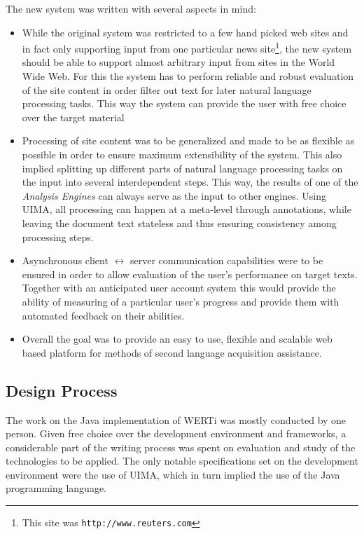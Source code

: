 \documentclass[12pt]{scrartcl}
\begin{document}
The new system was written with several aspects in mind:
\begin{itemize}
  \item While the original system was restricted to a few hand picked web sites
    and in fact only supporting input from one particular news
    site\footnote{This site was \texttt{http://www.reuters.com}}, the new system
    should be able to support almost arbitrary input from sites in the World
    Wide Web. For this the system has to perform reliable and robust evaluation
    of the site content in order filter out text for later natural language
    processing tasks. This way the system can provide the user with free choice over the
    target material %
  \item Processing of site content was to  be generalized and made to be as
    flexible as possible in order to ensure maximum extensibility of the
    system. This also implied splitting up different parts of natural
    language 
    processing tasks on the input into several interdependent steps. This way,
    the results of one of the \emph{Analysis Engines} can always serve as the
    input to other engines. Using UIMA, all processing can happen at a
    meta-level through annotations, while leaving the document text stateless
    and thus ensuring consistency among processing steps.
  \item Asynchronous client $\leftrightarrow$ server communication capabilities
    were to be ensured in
    order to allow evaluation of the user's performance on target texts.
    Together with an anticipated user account system this would provide
    the ability of measuring of a particular user's progress and provide them
    with automated feedback on their abilities.
  \item Overall the goal was to provide an easy to use, flexible and scalable web 
    based platform for methods of second
    language acquisition assistance.
\end{itemize}

\subsection{Design Process} The work on the Java implementation of WERTi 
was mostly conducted by one person. Given free choice over the
development environment and frameworks, a considerable part of the writing
process was spent on evaluation and study of the technologies to be applied. The
only notable specifications set on the development environment were the use of
UIMA, which in turn implied the use of the Java programming language.
\end{document}
